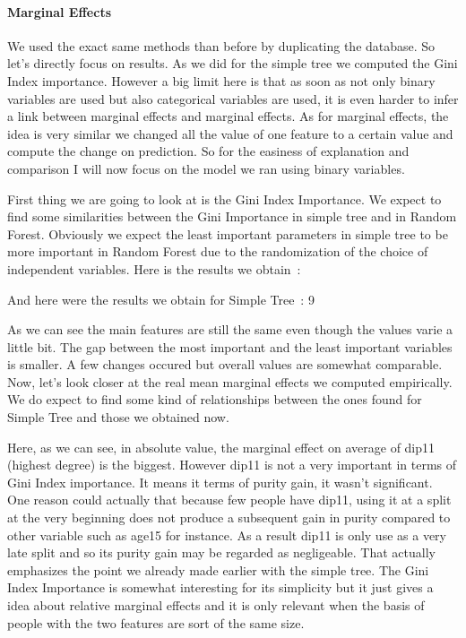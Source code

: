\paragraph{Marginal Effects}

We used the exact same methods than before by duplicating the database. So let’s directly focus on results.
As we did for the simple tree we computed the Gini Index importance.
However a big limit here is that as soon as not only binary variables are used but also categorical variables are used, it is even harder to infer a link between marginal effects and marginal effects. As for marginal effects, the idea is very similar we changed all the value of one feature to a certain value and compute the change on prediction.
So for the easiness of explanation and comparison I will now focus on the model we ran using binary variables.

First thing we are going to look at is the Gini Index Importance. We expect to find some similarities between the Gini Importance in simple tree and in Random Forest. Obviously we expect the least important parameters in simple tree to be more important in Random Forest due to the randomization of the choice of independent variables.
Here is the results we obtain :


And here were the results we obtain for Simple Tree :
9


As we can see the main features are still the same even though the values varie a little bit. The gap between the most important and the least important variables is smaller. A few changes occured but overall values are somewhat comparable.
Now, let’s look closer at the real mean marginal effects we computed empirically. We do expect to find some kind of relationships between the ones found for Simple Tree and those we obtained now.



Here, as we can see, in absolute value, the marginal effect on average of dip11 (highest degree) is the biggest. However dip11 is not a very important in terms of Gini Index importance. It means it terms of purity gain, it wasn’t significant. One reason could actually that because few people have dip11, using it at a split at the very beginning does not produce a subsequent gain in purity compared to other variable such as age15 for instance. As a result dip11 is only use as a very late split and so its purity gain may be regarded as negligeable. That actually emphasizes the point we already made earlier with the simple tree. The Gini Index Importance is somewhat interesting for its simplicity but it just gives a idea about relative marginal effects and it is only relevant when the basis of people with the two features are sort of the same size.

